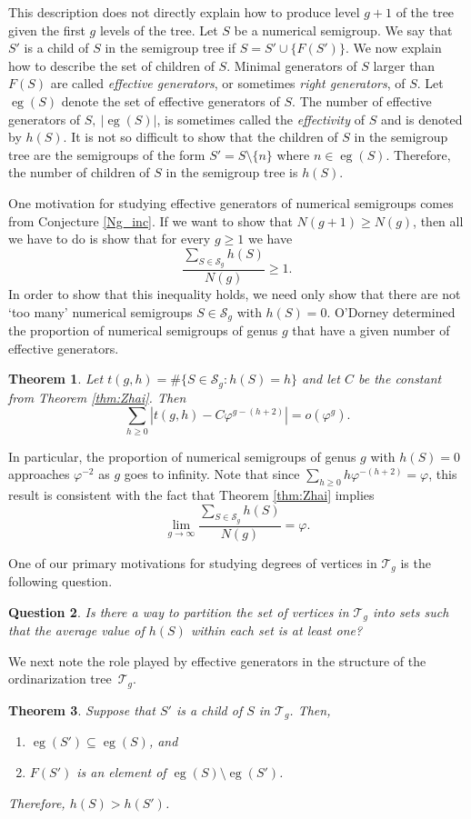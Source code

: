 \documentclass[12pt]{amsart}
\DeclareMathOperator{\eg}{eg}
\newcommand{\T}{{\mathcal T}}
\theoremstyle{plain}\newtheorem{proposition}{Proposition}[section]
\newtheorem{theorem}[proposition]{Theorem}
\newtheorem{question}[proposition]{Question}
\newtheorem{thm}[proposition]{Theorem}
\begin{document}
This description does not directly explain how to produce level $g+1$ of the tree given the first $g$ levels of the tree.  Let $S$ be a numerical semigroup.  We say that $S'$ is a child of $S$ in the semigroup tree if $S = S' \cup \{F(S')\}$.  We now explain how to describe the set of children of $S$.  Minimal generators of $S$ larger than $F(S)$ are called \emph{effective generators}, or sometimes \emph{right generators}, of $S$.  Let $\eg(S)$ denote the set of effective generators of $S$.  The number of effective generators of $S,\ |\eg(S)|$, is sometimes called the \emph{effectivity} of $S$ and is denoted by $h(S)$.  It is not so difficult to show that the children of $S$ in the semigroup tree are the semigroups of the form $S' = S \setminus \{n\}$ where $n \in \eg(S)$.  Therefore, the number of children of $S$ in the semigroup tree is $h(S)$.

One motivation for studying effective generators of numerical semigroups comes from Conjecture \ref{Ng_inc}.  If we want to show that $N(g+1) \ge N(g)$, then all we have to do is show that for every $g\ge 1$ we have
\[
\frac{\sum_{S\in \mathcal{S}_g} h(S)}{N(g)} \ge 1.
\]
In order to show that this inequality holds, we need only show that there are not `too many' numerical semigroups $S \in \mathcal{S}_g$ with $h(S) = 0$.  O'Dorney determined the proportion of numerical semigroups of genus $g$ that have a given number of effective generators.
\begin{thm}\cite[Theorem 2]{ODorney}
Let $t(g,h) = \#\{S \in \mathcal{S}_g \colon h(S) = h\}$ and let $C$ be the constant from Theorem \ref{thm:Zhai}.  Then
\[
\sum_{h \ge 0} |t(g,h) - C \varphi^{g-(h+2)}| = o(\varphi^g).
\]
\end{thm}
In particular, the proportion of numerical semigroups of genus $g$ with $h(S) = 0$ approaches $\varphi^{-2}$ as $g$ goes to infinity.  Note that since $\sum_{h \ge 0} h \varphi^{-(h+2)} = \varphi$, this result is consistent with the fact that Theorem \ref{thm:Zhai} implies
\[
\lim_{g \rightarrow \infty} \frac{\sum_{S\in \mathcal{S}_g} h(S)}{N(g)} = \varphi.
\]

One of our primary motivations for studying degrees of vertices in $\T_g$ is the following question.
\begin{question}
Is there a way to partition the set of vertices in $\T_g$ into sets such that the average value of $h(S)$ within each set is at least one?
\end{question}

We next note the role played by effective generators in the structure of the ordinarization tree~$\T_g$.
\begin{theorem}\label{strictly}
Suppose that $S'$ is a child of $S$ in $\T_g$.  Then,
\begin{enumerate}
\item $\eg(S') \subseteq \eg(S)$, and 
\item $F(S')$ is an element of $\eg(S) \setminus \eg(S')$.
\end{enumerate}
Therefore, $h(S) > h(S')$.
\end{theorem}
\end{document}
